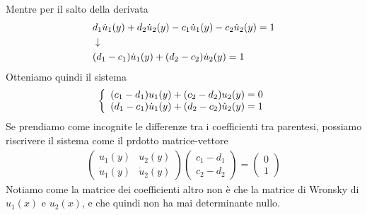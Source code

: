 Mentre per il salto della derivata
\begin{align}
	&d_1 \dot{u}_1 (y) + d_2 \dot{u}_2 (y) - c_1 \dot{u}_1 (y) - c_2 \dot{u}_2 (y) = 1 \\ &\downarrow \nonumber \\
	&(d_1 - c_1)\dot{u}_1 (y) + (d_2 - c_2)\dot{u}_2 (y) = 1 
\end{align}
Otteniamo quindi il sistema
\begin{align}
	\left\{ \begin{array}{cc} (c_1 - d_1) u_1 (y) +(c_2 - d_2)u_2 (y) =0\\ (d_1 - c_1)\dot{u}_1 (y) + (d_2 - c_2)\dot{u}_2 (y) = 1 \end{array} \right.
\end{align}
Se prendiamo come incognite le differenze tra i coefficienti tra parentesi, possiamo riscrivere il sistema come il prdotto matrice-vettore
\begin{align}
	\begin{pmatrix}
		u_1 (y) & u_2 (y)\\
		\dot{u}_1 (y) & \dot{u}_2 (y)
	\end{pmatrix} \left( \begin{array}{c}
	c_1 - d_1\\
	c_2 - d_2
\end{array} \right) = \left( \begin{array}{c}
0\\
1
\end{array} \right)
\end{align}
Notiamo come la matrice dei coefficienti altro non è che la matrice di Wronsky di $u_1(x)$ e $u_2(x)$, e che quindi non ha mai determinante nullo. 


